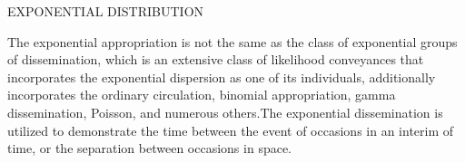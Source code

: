 \documentclass[11pt]{article}
\begin{document}
EXPONENTIAL DISTRIBUTION

The exponential appropriation is not the same as the class of exponential groups of dissemination, which is an extensive class of likelihood conveyances that incorporates the exponential dispersion as one of its individuals, additionally incorporates the ordinary circulation, binomial appropriation, gamma dissemination, Poisson, and numerous others.The exponential dissemination is utilized to demonstrate the time between the event of occasions in an interim of time, or the separation between occasions in space.
\end{document}
